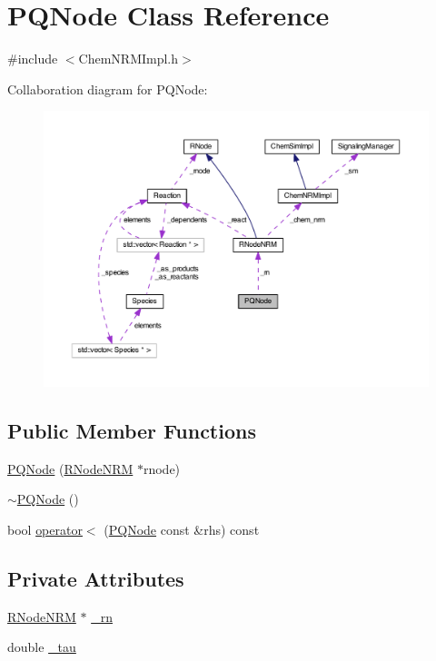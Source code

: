 \hypertarget{classPQNode}{\section{P\-Q\-Node Class Reference}
\label{classPQNode}
}


{\ttfamily \#include $<$Chem\-N\-R\-M\-Impl.\-h$>$}



Collaboration diagram for P\-Q\-Node\-:\nopagebreak
\begin{figure}[H]
\begin{center}
\leavevmode
\includegraphics[width=350pt]{classPQNode__coll__graph}
\end{center}
\end{figure}
\subsection*{Public Member Functions}
\begin{DoxyCompactItemize}
\item 
\hyperlink{classPQNode_a4b7e508ee10dbc6cb1bbabf8bcda593a}{P\-Q\-Node} (\hyperlink{classRNodeNRM}{R\-Node\-N\-R\-M} $\ast$rnode)
\item 
\hyperlink{classPQNode_ac96492ddb5848c1d3cad999299caa77c}{$\sim$\-P\-Q\-Node} ()
\item 
bool \hyperlink{classPQNode_ac8c314f7f49375577b4b8ef2d90910b2}{operator$<$} (\hyperlink{classPQNode}{P\-Q\-Node} const \&rhs) const 
\end{DoxyCompactItemize}
\subsection*{Private Attributes}
\begin{DoxyCompactItemize}
\item 
\hyperlink{classRNodeNRM}{R\-Node\-N\-R\-M} $\ast$ \hyperlink{classPQNode_a3405abd2d51a7cdde311fda2185fc50e}{\-\_\-rn}
\item 
double \hyperlink{classPQNode_a1cf2f8482af1add65c9b6c35bfa0857f}{\-\_\-tau}
\end{DoxyCompactItemize}
